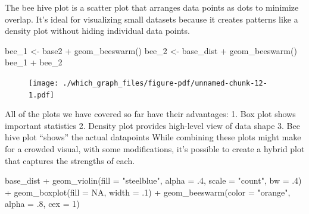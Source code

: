 \documentclass[
  letterpaper,
]{book}
\newenvironment{Shaded}{\begin{snugshade}}{\end{snugshade}}
\newcommand{\AttributeTok}[1]{\textcolor[rgb]{0.40,0.45,0.13}{#1}}
\newcommand{\ConstantTok}[1]{\textcolor[rgb]{0.56,0.35,0.01}{#1}}
\newcommand{\DecValTok}[1]{\textcolor[rgb]{0.68,0.00,0.00}{#1}}
\newcommand{\FunctionTok}[1]{\textcolor[rgb]{0.28,0.35,0.67}{#1}}
\newcommand{\NormalTok}[1]{\textcolor[rgb]{0.00,0.23,0.31}{#1}}
\newcommand{\OtherTok}[1]{\textcolor[rgb]{0.00,0.23,0.31}{#1}}
\newcommand{\SpecialCharTok}[1]{\textcolor[rgb]{0.37,0.37,0.37}{#1}}
\newcommand{\StringTok}[1]{\textcolor[rgb]{0.13,0.47,0.30}{#1}}
\begin{document}
The bee hive plot is a scatter plot that arranges data points as dots to
minimize overlap. It's ideal for visualizing small datasets because it
creates patterns like a density plot without hiding individual data
points.

\begin{Shaded}
\begin{Highlighting}[]
\NormalTok{bee\_1 }\OtherTok{\textless{}{-}}\NormalTok{ base2 }\SpecialCharTok{+} \FunctionTok{geom\_beeswarm}\NormalTok{() }
\NormalTok{bee\_2 }\OtherTok{\textless{}{-}}\NormalTok{ base\_dist }\SpecialCharTok{+} \FunctionTok{geom\_beeswarm}\NormalTok{()}
\NormalTok{bee\_1 }\SpecialCharTok{+}\NormalTok{ bee\_2}
\end{Highlighting}
\end{Shaded}

\begin{figure}[H]

{\centering \texttt{[image: ./which\_graph\_files/figure-pdf/unnamed-chunk-12-1.pdf]}

}

\end{figure}

All of the plots we have covered so far have their advantages: 1. Box
plot shows important statistics 2. Density plot provides high-level view
of data shape 3. Bee hive plot ``shows'' the actual datapoints While
combining these plots might make for a crowded visual, with some
modifications, it's possible to create a hybrid plot that captures the
strengths of each.

\begin{Shaded}
\begin{Highlighting}[]
\NormalTok{base\_dist }\SpecialCharTok{+} \FunctionTok{geom\_violin}\NormalTok{(}\AttributeTok{fill =} \StringTok{"steelblue"}\NormalTok{, }\AttributeTok{alpha =}\NormalTok{ .}\DecValTok{4}\NormalTok{, }\AttributeTok{scale =} \StringTok{"count"}\NormalTok{, }\AttributeTok{bw =}\NormalTok{ .}\DecValTok{4}\NormalTok{) }\SpecialCharTok{+} \FunctionTok{geom\_boxplot}\NormalTok{(}\AttributeTok{fill =} \ConstantTok{NA}\NormalTok{, }\AttributeTok{width =}\NormalTok{ .}\DecValTok{1}\NormalTok{) }\SpecialCharTok{+} \FunctionTok{geom\_beeswarm}\NormalTok{(}\AttributeTok{color =} \StringTok{"orange"}\NormalTok{, }\AttributeTok{alpha =}\NormalTok{ .}\DecValTok{8}\NormalTok{, }\AttributeTok{cex =} \DecValTok{1}\NormalTok{) }
\end{Highlighting}
\end{Shaded}
\end{document}
